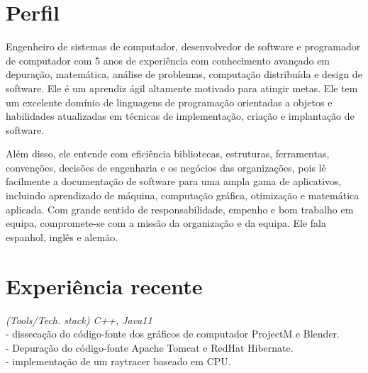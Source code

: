 \documentclass[]{CV-JuanCamiloFlorez}
\begin{document}
\begin{minipage}[t]{0.66\textwidth} 


\section{Perfil}
\parindent=20pt Engenheiro de sistemas de computador, desenvolvedor de software e programador de computador com 5 anos de experiência com conhecimento avançado em depuração, matemática, análise de problemas, computação distribuída e design de software. Ele é um aprendiz ágil altamente motivado para atingir metas. Ele tem um excelente domínio de linguagens de programação orientadas a objetos e habilidades atualizadas em técnicas de implementação, criação e implantação de software.

\parindent=20pt Além disso, ele entende com eficiência bibliotecas, estruturas, ferramentas, convenções, decisões de engenharia e os negócios das organizações, pois lê facilmente a documentação de software para uma ampla gama de aplicativos, incluindo aprendizado de máquina, computação gráfica, otimização e matemática aplicada. Com grande sentido de responsabilidade, empenho e bom trabalho em equipa, compromete-se com a missão da organização e da equipa. Ele fala espanhol, inglês e alemão.

\sectionsep

\section{Experiência recente}
    \noindent
    \textit{(Tools/Tech. stack) C++, Java11} \\
        - dissecação do código-fonte dos gráficos de computador ProjectM e Blender. \\
        - Depuração do código-fonte Apache Tomcat e RedHat Hibernate. \\
        - implementação de um raytracer baseado em CPU. \\
        \sectionsep


\end{minipage}
\end{document}
